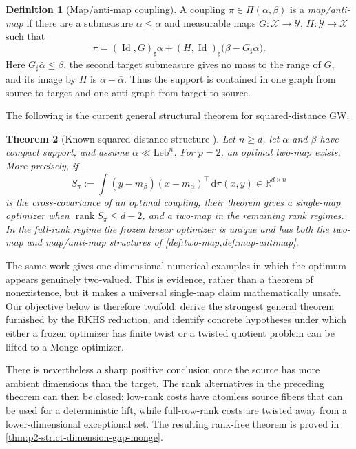 \documentclass[11pt,a4paper]{article}
\newtheorem{theorem}{Theorem}[section]
\theoremstyle{definition}
\newtheorem{definition}[theorem]{Definition}
\theoremstyle{remark}
\newcommand{\R}{\mathbb R}
\newcommand{\Piopt}{\Pi}
\newcommand{\Id}{\operatorname{Id}}
\newcommand{\rank}{\operatorname{rank}}
\newcommand{\dd}{\,\mathrm d}
\begin{document}
\begin{definition}[Map/anti-map coupling]
\label{def:map-antimap}
A coupling \(\pi\in\Piopt(\alpha,\beta)\) is a \emph{map/anti-map} if there
are a submeasure \(\bar\alpha\leq\alpha\) and measurable maps
\(G:\mathcal X\to\mathcal Y\), \(H:\mathcal Y\to\mathcal X\) such that
\begin{equation}
  \pi=(\Id,G)_\sharp\bar\alpha
      +(H,\Id)_\sharp\bigl(\beta-G_\sharp\bar\alpha\bigr).
  \label{eq:map-antimap-decomposition}
\end{equation}
Here \(G_\sharp\bar\alpha\leq\beta\), the second target submeasure gives no
mass to the range of \(G\), and its image by \(H\) is
\(\alpha-\bar\alpha\).  Thus the support is contained in one graph from
source to target and one anti-graph from target to source.
\end{definition}

The following is the current general structural theorem for squared-distance
GW.

\begin{theorem}[Known squared-distance structure
  \citealp{DumontLacombeVialard2025}]
\label{thm:known-two-map}
Let \(n\geq d\), let \(\alpha\) and \(\beta\) have compact support, and assume
\(\alpha\ll\mathrm{Leb}^n\).  For \(p=2\), an optimal two-map exists.  More
precisely, if
\[
  S_\pi:=\int
  (y-m_\beta)(x-m_\alpha)^\top\dd\pi(x,y)
  \in\R^{d\times n}
\]
is the cross-covariance of an optimal coupling, their theorem gives a
single-map optimizer when \(\rank S_\pi\leq d-2\), and a two-map in the
remaining rank regimes.  In the full-rank regime the frozen linear optimizer
is unique and has both the two-map and map/anti-map structures of
\cref{def:two-map,def:map-antimap}.
\end{theorem}

The same work gives one-dimensional numerical examples in which the optimum
appears genuinely two-valued.  This is evidence, rather than a theorem of
nonexistence, but it makes a universal single-map claim mathematically
unsafe.  Our objective below is therefore twofold: derive the strongest
general theorem furnished by the RKHS reduction, and identify concrete
hypotheses under which either a frozen optimizer has finite twist or a
twisted quotient problem can be lifted to a Monge optimizer.

There is nevertheless a sharp positive conclusion once the source has more
ambient dimensions than the target.  The rank alternatives in the preceding
theorem can then be closed: low-rank costs have atomless source fibers that can
be used for a deterministic lift, while full-row-rank costs are twisted away
from a lower-dimensional exceptional set.  The resulting rank-free theorem
is proved in \cref{thm:p2-strict-dimension-gap-monge}.
\end{document}
